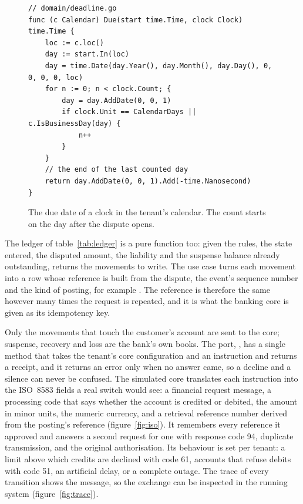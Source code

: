 \begin{figure}[htbp]
\begin{lstlisting}
// domain/deadline.go
func (c Calendar) Due(start time.Time, clock Clock) time.Time {
	loc := c.loc()
	day := start.In(loc)
	day = time.Date(day.Year(), day.Month(), day.Day(), 0, 0, 0, 0, loc)
	for n := 0; n < clock.Count; {
		day = day.AddDate(0, 0, 1)
		if clock.Unit == CalendarDays || c.IsBusinessDay(day) {
			n++
		}
	}
	// the end of the last counted day
	return day.AddDate(0, 0, 1).Add(-time.Nanosecond)
}
\end{lstlisting}
\caption{The due date of a clock in the tenant's calendar. The count starts on the day after the dispute opens.}
\label{fig:due}
\end{figure}

The ledger of table~\ref{tab:ledger} is a pure function too: given the rules, the state entered, the disputed amount,
the liability and the suspense balance already outstanding,  returns the movements to write.
The use case turns each movement into a row whose reference is built from the dispute, the event's sequence number
and the kind of posting, for example . The reference is therefore the same however many
times the request is repeated, and it is what the banking core is given as its idempotency key.

Only the movements that touch the customer's account are sent to the core; suspense, recovery and loss are the
bank's own books. The port, , has a single method that takes the tenant's core configuration and
an instruction and returns a receipt, and it returns an error only when no answer came, so a decline and a silence
can never be confused. The simulated core translates each instruction into the ISO~8583 fields a real switch would
see: a financial request message, a processing code that says whether the account is credited or debited, the
amount in minor units, the numeric currency, and a retrieval reference number derived from the posting's reference
(figure~\ref{fig:iso}). It remembers every reference it approved and answers a second request for one with response
code 94, duplicate transmission, and the original authorisation. Its behaviour is set per tenant: a limit above
which credits are declined with code 61, accounts that refuse debits with code 51, an artificial delay, or a
complete outage. The trace of every transition shows the message, so the exchange can be inspected in the running
system (figure~\ref{fig:trace}).

